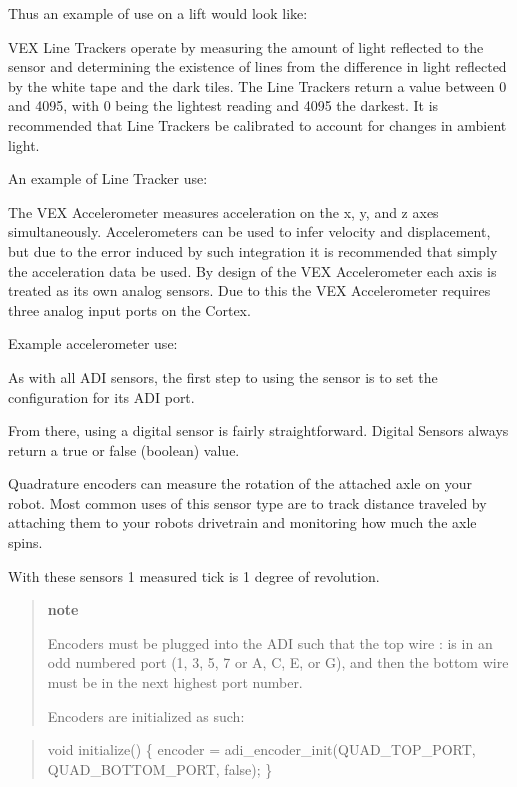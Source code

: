 Thus an example of use on a lift would look like\+:

V\+EX Line Trackers operate by measuring the amount of light reflected to the sensor and determining the existence of lines from the difference in light reflected by the white tape and the dark tiles. The Line Trackers return a value between 0 and 4095, with 0 being the lightest reading and 4095 the darkest. It is recommended that Line Trackers be calibrated to account for changes in ambient light.

An example of Line Tracker use\+:

The V\+EX Accelerometer measures acceleration on the x, y, and z axes simultaneously. Accelerometers can be used to infer velocity and displacement, but due to the error induced by such integration it is recommended that simply the acceleration data be used. By design of the V\+EX Accelerometer each axis is treated as its own analog sensors. Due to this the V\+EX Accelerometer requires three analog input ports on the Cortex.

Example accelerometer use\+:

As with all A\+DI sensors, the first step to using the sensor is to set the configuration for its A\+DI port.

From there, using a digital sensor is fairly straightforward. Digital Sensors always return a true or false (boolean) value.

Quadrature encoders can measure the rotation of the attached axle on your robot. Most common uses of this sensor type are to track distance traveled by attaching them to your robots drivetrain and monitoring how much the axle spins.

With these sensors 1 measured tick is 1 degree of revolution.

\begin{quote}
{\bfseries note}

Encoders must be plugged into the A\+DI such that the top wire \+: is in an odd numbered port (1, 3, 5, 7 or \textquotesingle{}A\textquotesingle{}, \textquotesingle{}C\textquotesingle{}, \textquotesingle{}E\textquotesingle{}, or \textquotesingle{}G\textquotesingle{}), and then the bottom wire must be in the next highest port number.

Encoders are initialized as such\+: \end{quote}


\begin{quote}

\begin{DoxyCode}
void initialize() \{
  encoder = adi\_encoder\_init(QUAD\_TOP\_PORT, QUAD\_BOTTOM\_PORT, false);
\}
\end{DoxyCode}
 \end{quote}


